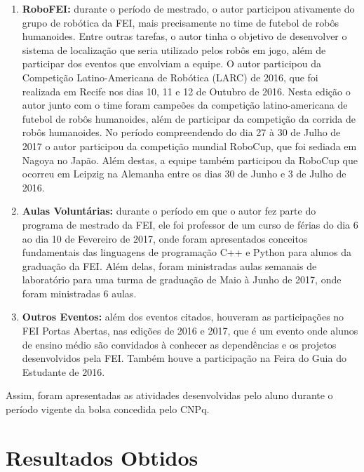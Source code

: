 \documentclass[
  12pt,       %
  oneside,
  a4paper,      %
  english,      %
  french,       %
  spanish,      %
  brazil,       %
  ]{abntex2}
\begin{document}
\begin{enumerate}
  \item \textbf{RoboFEI:} durante o período de mestrado, o autor participou ativamente do grupo de robótica da FEI, mais precisamente no time de futebol de robôs humanoides.
  Entre outras tarefas, o autor tinha o objetivo de desenvolver o sistema de localização que seria utilizado pelos robôs em jogo, além de participar dos eventos que envolviam a equipe.
  O autor participou da Competição Latino-Americana de Robótica (LARC) de 2016, que foi realizada em Recife nos dias 10, 11 e 12 de Outubro de 2016.
  Nesta edição o autor junto com o time foram campeões da competição latino-americana de futebol de robôs humanoides, além de participar da competição da corrida de robôs humanoides.
  No período compreendendo do dia 27 à 30 de Julho de 2017 o autor participou da competição mundial RoboCup, que foi sediada em Nagoya no Japão.
  Além destas, a equipe também participou da RoboCup que ocorreu em Leipzig na Alemanha entre os dias 30 de Junho e 3 de Julho de 2016.

  \item \textbf{Aulas Voluntárias:} durante o período em que o autor fez parte do programa de mestrado da FEI, ele foi professor de um curso de férias do dia 6 ao dia 10 de Fevereiro de 2017, onde foram apresentados conceitos fundamentais das linguagens de programação C++ e Python para alunos da graduação da FEI.
  Além delas, foram ministradas aulas semanais de laboratório para uma turma de graduação de Maio à Junho de 2017, onde foram ministradas 6 aulas.

  \item \textbf{Outros Eventos:} além dos eventos citados, houveram as participações no FEI Portas Abertas, nas edições de 2016 e 2017, que é um evento onde alunos de ensino médio são convidados à conhecer as dependências e os projetos desenvolvidos pela FEI.
  Também houve a participação na Feira do Guia do Estudante de 2016.

\end{enumerate}

Assim, foram apresentadas as atividades desenvolvidas pelo aluno durante o período vigente da bolsa concedida pelo CNPq.


\chapter{Resultados Obtidos}
\end{document}
